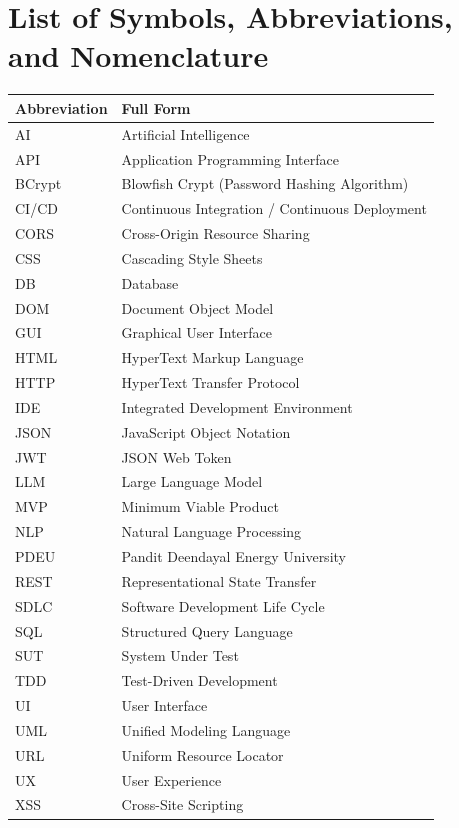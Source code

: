 \chapter*{List of Symbols, Abbreviations, and Nomenclature}

\begin{longtable}{@{}p{3.5cm} p{10cm}@{}}
\toprule
\textbf{Abbreviation} & \textbf{Full Form} \\
\midrule
\endhead

AI      & Artificial Intelligence \\
API     & Application Programming Interface \\
BCrypt  & Blowfish Crypt (Password Hashing Algorithm) \\
CI/CD   & Continuous Integration / Continuous Deployment \\
CORS    & Cross-Origin Resource Sharing \\
CSS     & Cascading Style Sheets \\
DB      & Database \\
DOM     & Document Object Model \\
GUI     & Graphical User Interface \\
HTML    & HyperText Markup Language \\
HTTP    & HyperText Transfer Protocol \\
IDE     & Integrated Development Environment \\
JSON    & JavaScript Object Notation \\
JWT     & JSON Web Token \\
LLM     & Large Language Model \\
MVP     & Minimum Viable Product \\
NLP     & Natural Language Processing \\
PDEU    & Pandit Deendayal Energy University \\
REST    & Representational State Transfer \\
SDLC    & Software Development Life Cycle \\
SQL     & Structured Query Language \\
SUT     & System Under Test \\
TDD     & Test-Driven Development \\
UI      & User Interface \\
UML     & Unified Modeling Language \\
URL     & Uniform Resource Locator \\
UX      & User Experience \\
XSS     & Cross-Site Scripting \\

\bottomrule
\end{longtable}
